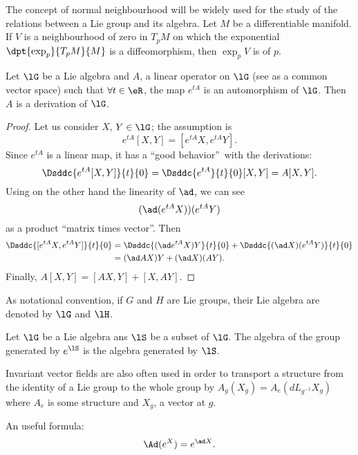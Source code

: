 The concept of normal neighbourhood will be widely used for the study of the relations between a Lie group and its algebra. Let $M$ be a differentiable manifold. If $V$ is a neighbourhood of zero in $T_pM$ on which the exponential $\dpt{\exp_p}{T_pM}{M}$ is a diffeomorphism, then $\exp_pV$ is   of $p$.

\begin{lemma}
Let $\lG$ be a Lie algebra and $A$, a linear operator on $\lG$ (see as a common vector space) such that $\forall t\in\eR$, the map $e^{tA}$ is an automorphism of $\lG$. Then $A$ is a derivation of $\lG$.
\label{lem:autom_derr}
\end{lemma}

\begin{proof}
Let us consider $X$, $Y\in\lG$;  the assumption is
\[
  e^{tA}[X,Y]=[e^{tA}X,e^{tA}Y].
\]
Since $e^{tA}$ is a linear map, it has a ``good behavior''\ with the derivations:
\[
\Dsddc{e^{tA}[X,Y]}{t}{0}=\Dsddc{e^{tA}}{t}{0}[X,Y]=A[X,Y].
\]
Using on the other hand the linearity of $\ad$, we can see
\[
  (\ad(e^{tA}X))(e^{tA}Y)
\]
as a product ``matrix times vector''. Then
\begin{equation}
\begin{split}
  \Dsddc{[e^{tA}X,e^{tA}Y]}{t}{0}&=\Dsddc{(\ad e^{tA}X)Y}{t}{0}+\Dsddc{(\ad X)(e^{tA}Y)}{t}{0}\\
                                 &=(\ad AX)Y+(\ad X)(AY).
\end{split}
\end{equation}
Finally, $A[X,Y]=[AX,Y]+[X,AY]$.

\end{proof}

As notational convention, if $G$ and $H$ are Lie groups, their Lie algebra are denoted by $\lG$ and $\lH$.

\begin{lemma}		\label{LemAlgEtGroupesGenere}
	Let $\lG$ be a Lie algebra ans $\lS$ be a subset of $\lG$. The algebra of the group generated by $ e^{\lS}$ is the algebra generated by $\lS$.
\end{lemma}

Invariant vector fields are also often used in order to transport a structure from the identity of a Lie group to the whole group by $A_g(X_g)=A_e(dL_{g^{-1}}X_g)$ where $A_e$ is some structure and $X_g$, a vector at $g$.


\begin{corollary}\label{Ad_e}
An useful formula:
\[
   \Ad(e^X)=e^{\ad X}.
\]
\end{corollary}

